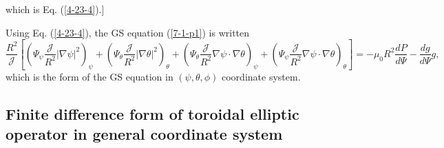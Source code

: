 \documentclass{llncs}
\begin{document}
which is Eq. (\ref{4-23-4}).]

Using Eq. (\ref{4-23-4}), the GS equation (\ref{7-1-p1}) is written
\begin{equation}
  \label{4-25-7} \frac{R^2}{\mathcal{J}} \left[ \left( \Psi_{\psi}
  \frac{\mathcal{J}}{R^2} | \nabla \psi |^2 \right)_{\psi} + \left(
  \Psi_{\theta} \frac{\mathcal{J}}{R^2} | \nabla \theta |^2 \right)_{\theta} +
  \left( \Psi_{\theta} \frac{\mathcal{J}}{R^2} \nabla \psi \cdot \nabla \theta
  \right)_{\psi} + \left( \Psi_{\psi} \frac{\mathcal{J}}{R^2} \nabla \psi
  \cdot \nabla \theta \right)_{\theta} \right] = - \mu_0 R^2 \frac{d P}{d
  \Psi} - \frac{d g}{d \Psi} g,
\end{equation}
which is the form of the GS equation in $(\psi, \theta, \phi)$ coordinate
system.

\subsection{Finite difference form of toroidal elliptic operator in general
coordinate system}
\end{document}
